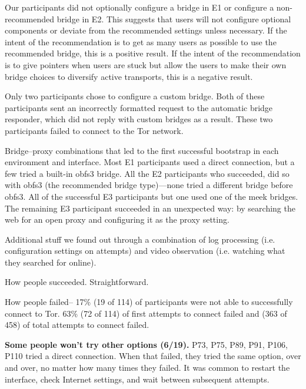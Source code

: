 \documentclass[USenglish,oneside,twocolumn]{article}
\begin{document}
{Our participants did not optionally configure a bridge in E1 or configure a non-recommended bridge in E2. This suggests that users will not configure optional components or deviate from the recommended settings unless necessary. If the intent of the recommendation is to get as many users as possible to use the recommended bridge, this is a positive result. If the intent of the recommendation is to give pointers when users are stuck but allow the users to make their own bridge choices to diversify active transports, this is a negative result. 

Only two participants chose to configure a custom bridge. Both of these participants sent an incorrectly formatted request to the automatic bridge responder, which did not reply with custom bridges as a result. These two participants failed to connect to the Tor network. 

\begin{table}
\centering

\caption{
Bridge--proxy combinations that led to the first successful bootstrap
in each environment and interface.
Most E1 participants used a direct connection,
but a few tried a built-in obfs3 bridge.
All the E2 participants who succeeded,
did so with obfs3 (the recommended bridge type)---none tried
a different bridge before obfs3.
All of the successful E3 participants but one
used one of the meek bridges.
The remaining E3 participant succeeded in an unexpected way:
by searching the web for an open proxy and configuring it
as the proxy setting.
}
\label{tab:attempts-bridge-proxy}
\end{table}

{\color {red} 
Additional stuff we found out through a combination of log processing (i.e. configuration settings on attempts) and video observation (i.e. watching what they searched for online).

How people succeeded. Straightforward. 

How people failed-- 17\% (19 of 114) of participants were not able to successfully connect to Tor. 63\% (72 of 114) of first attempts to connect failed and (363 of 458) of total attempts to connect failed. \\ 

\begin{description}
\item {\bfseries Some people won't try other options (6/19).} P73, P75, P89, P91, P106, P110 tried a direct connection. When that failed, they tried the same option, over and over, no matter how many times they failed. It was common to restart the interface, check Internet settings, and wait between subsequent attempts.


\end{description}}}
\end{document}
